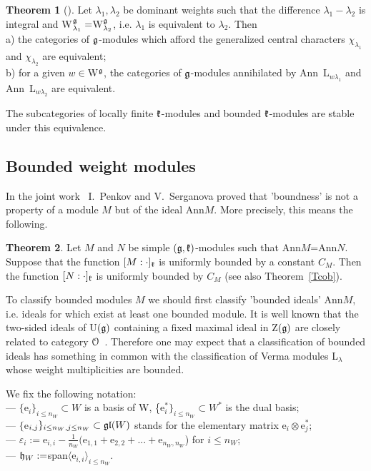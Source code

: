 \documentclass[12pt]{amsart}
\theoremstyle{definition}\newtheorem{theorem}{Theorem}[section]
\theoremstyle{definition}\newtheorem{definition}[proposition]{Definition}
\theoremstyle{remark}\newtheorem{example}[proposition]{Example}
\begin{document}
\begin{theorem}[\cite{BeG}]\label{Tweq} Let $\lambda_1, \lambda_2$ be dominant weights such that the difference $\lambda_1-\lambda_2$ is integral and W$^\frak g_{\lambda_1}=$W$^\frak g_{\lambda_2}$, i.e. $\lambda_1$ is equivalent to $\lambda_2$. Then\\a) the categories of $\frak g$-modules which afford the generalized central characters $\chi_{\lambda_1}$ and $\chi_{\lambda_2}$ are equivalent;\\b) for a given $w\in$W$^\frak g$, the categories of $\frak g$-modules annihilated by Ann~L$_{w\lambda_1}$ and Ann~L$_{w\lambda_2}$ are equivalent.\end{theorem}
The subcategories of locally finite $\frak k$-modules and bounded $\frak k$-modules are stable under this equivalence.
\subsection{Bounded weight modules}\label{SM} In the joint work~\cite{PS} I.~Penkov and V.~Serganova proved that 'boundness' is not a property of a module $M$ but of the ideal
Ann$M$. More precisely, this means the following.
\begin{theorem}\label{Trel}Let $M$ and $N$ be simple $(\frak g, \frak k)$-modules such that Ann$M$=Ann$N$. Suppose that the function $[M:\cdot]_\frak k$ is uniformly bounded by a constant $C_M$. Then the function $[N:\cdot]_\frak k$ is uniformly bounded by $C_M$ (see also Theorem~\ref{Tcob}).\end{theorem}
To classify bounded modules $M$ we should first classify 'bounded ideals' Ann$M$, i.e. ideals for which exist at least one bounded module. It is well known that the two-sided ideals of U$(\frak g)$ containing a fixed maximal ideal in Z$(\frak g)$ are closely related to category $\EuScript O$~\cite{BeG}. Therefore one may expect that a classification of bounded ideals has something in common with the classification of Verma modules L$_\lambda$ whose weight multiplicities are bounded.

We fix the following notation:\\
--- $\{$e$_i\}_{i\le n_W} \subset W$ is a basis of W, \{e$_i^*\}_{i\le n_W}\subset W^*$ is the dual basis;\\
--- $\{$e$_{i,j}\}_{i\le n_W , j\le n_W}\subset\frak{gl}(W)$ stands for the elementary matrix e$_i\otimes$e$_j^*$;\\
--- $\varepsilon_i:=$e$_{i,i}-\frac{1}{n_W}($e$_{1,1}+$e$_{2,2}+...+$e$_{n_W, n_W}$) for $i\le n_W$;\\
--- $\frak h_W:=$span$\langle$e$_{i,i}\rangle_{i\le n_W}$.
\end{document}
